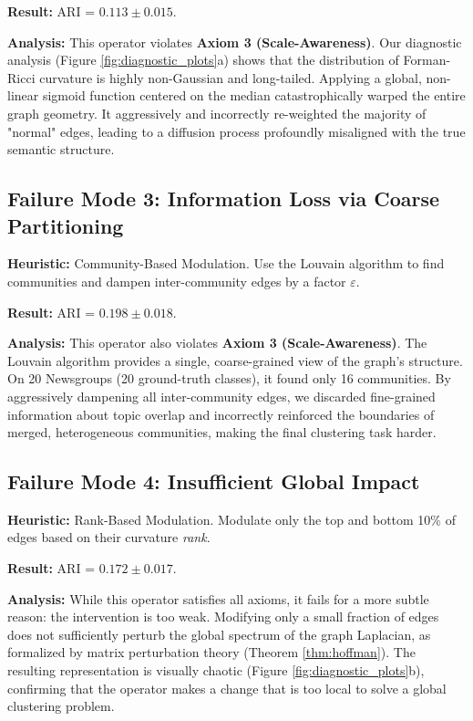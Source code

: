 \documentclass[11pt, letterpaper, twoside]{article}
\theoremstyle{definition}
\begin{document}
\noindent\textbf{Result:} ARI = $0.113 \pm 0.015$.

\noindent\textbf{Analysis:} This operator violates \textbf{Axiom 3 (Scale-Awareness)}. Our diagnostic analysis (Figure \ref{fig:diagnostic_plots}a) shows that the distribution of Forman-Ricci curvature is highly non-Gaussian and long-tailed. Applying a global, non-linear sigmoid function centered on the median catastrophically warped the entire graph geometry. It aggressively and incorrectly re-weighted the majority of "normal" edges, leading to a diffusion process profoundly misaligned with the true semantic structure.

\subsection{Failure Mode 3: Information Loss via Coarse Partitioning}
\textbf{Heuristic:} Community-Based Modulation. Use the Louvain algorithm to find communities and dampen inter-community edges by a factor $\varepsilon$.

\noindent\textbf{Result:} ARI = $0.198 \pm 0.018$.

\noindent\textbf{Analysis:} This operator also violates \textbf{Axiom 3 (Scale-Awareness)}. The Louvain algorithm provides a single, coarse-grained view of the graph's structure. On 20 Newsgroups (20 ground-truth classes), it found only 16 communities. By aggressively dampening all inter-community edges, we discarded fine-grained information about topic overlap and incorrectly reinforced the boundaries of merged, heterogeneous communities, making the final clustering task harder.

\subsection{Failure Mode 4: Insufficient Global Impact}
\textbf{Heuristic:} Rank-Based Modulation. Modulate only the top and bottom 10\% of edges based on their curvature \textit{rank}.

\noindent\textbf{Result:} ARI = $0.172 \pm 0.017$.

\noindent\textbf{Analysis:} While this operator satisfies all axioms, it fails for a more subtle reason: the intervention is too weak. Modifying only a small fraction of edges does not sufficiently perturb the global spectrum of the graph Laplacian, as formalized by matrix perturbation theory (Theorem \ref{thm:hoffman}). The resulting representation is visually chaotic (Figure \ref{fig:diagnostic_plots}b), confirming that the operator makes a change that is too local to solve a global clustering problem.
\end{document}
